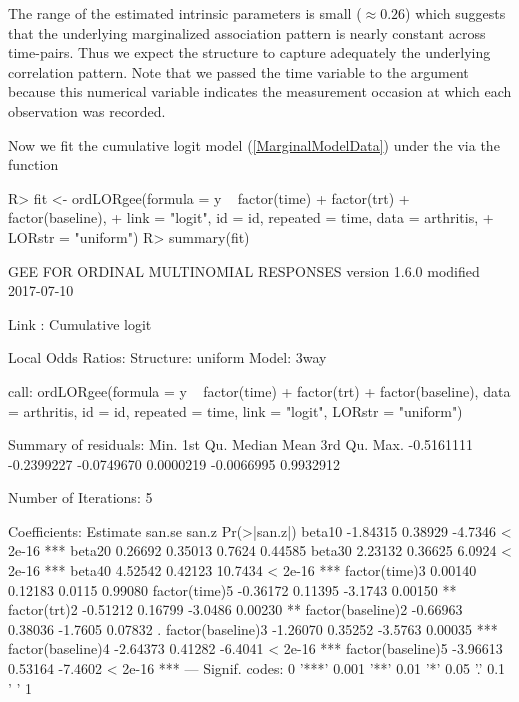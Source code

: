 \documentclass[article,shortnames,nojss]{jss}
\begin{document}
The range of the estimated intrinsic parameters is small ($\approx 0.26$) which suggests that the underlying marginalized association pattern is nearly constant across time-pairs. Thus we expect the  structure to capture adequately the underlying correlation pattern. Note that we passed the time variable to the  argument because this numerical variable indicates the measurement occasion at which each observation was recorded.

Now we fit the cumulative logit model (\ref{MarginalModelData}) under the  via the function  
\begin{Schunk}
\begin{Sinput}
R>  fit <- ordLORgee(formula = y ~ factor(time) + factor(trt) + factor(baseline),
+           link = "logit", id = id, repeated = time, data = arthritis,
+           LORstr = "uniform")
R>  summary(fit)
\end{Sinput}
\begin{Soutput}
GEE FOR ORDINAL MULTINOMIAL RESPONSES 
version 1.6.0 modified 2017-07-10 

Link : Cumulative logit 

Local Odds Ratios:
Structure:         uniform
Model:             3way

call:
ordLORgee(formula = y ~ factor(time) + factor(trt) + factor(baseline), 
    data = arthritis, id = id, repeated = time, link = "logit", 
    LORstr = "uniform")

Summary of residuals:
      Min.    1st Qu.     Median       Mean    3rd Qu.       Max. 
-0.5161111 -0.2399227 -0.0749670  0.0000219 -0.0066995  0.9932912 

Number of Iterations: 5 

Coefficients:
                  Estimate   san.se   san.z Pr(>|san.z|)    
beta10            -1.84315  0.38929 -4.7346      < 2e-16 ***
beta20             0.26692  0.35013  0.7624      0.44585    
beta30             2.23132  0.36625  6.0924      < 2e-16 ***
beta40             4.52542  0.42123 10.7434      < 2e-16 ***
factor(time)3      0.00140  0.12183  0.0115      0.99080    
factor(time)5     -0.36172  0.11395 -3.1743      0.00150 ** 
factor(trt)2      -0.51212  0.16799 -3.0486      0.00230 ** 
factor(baseline)2 -0.66963  0.38036 -1.7605      0.07832 .  
factor(baseline)3 -1.26070  0.35252 -3.5763      0.00035 ***
factor(baseline)4 -2.64373  0.41282 -6.4041      < 2e-16 ***
factor(baseline)5 -3.96613  0.53164 -7.4602      < 2e-16 ***
---
Signif. codes:  0 '***' 0.001 '**' 0.01 '*' 0.05 '.' 0.1 ' ' 1


\end{Soutput}
\end{Schunk}
\end{document}
